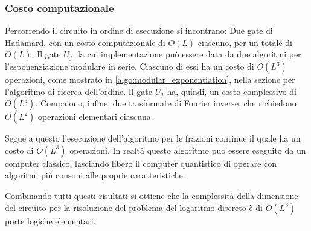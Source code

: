 \subsubsection{Costo computazionale}
Percorrendo il circuito in ordine di esecuzione si incontrano:
Due gate di Hadamard, con un costo computazionale di $O(L)$ ciascuno, per un totale di $O(L)$.
Il gate $U_f$, la cui implementazione può essere data da due algoritmi per l'esponenziazione modulare in serie.
Ciascuno di essi ha un costo di $O(L^3)$ operazioni, come mostrato in \ref{algo:modular_exponentiation}, nella sezione per l'algoritmo di ricerca dell'ordine.
Il gate $U_f$ ha, quindi, un costo complessivo di $O(L^3)$.
Compaiono, infine, due trasformate di Fourier inverse, che richiedono $O(L^2)$ operazioni elementari ciascuna.

Segue a questo l'esecuzione dell'algoritmo per le frazioni continue il quale ha un costo di $O(L^3)$ operazioni.
In realtà questo algoritmo può essere eseguito da un computer classico, lasciando libero il computer quantistico di operare con algoritmi più consoni alle proprie caratteristiche.

Combinando tutti questi risultati si ottiene che la complessità della dimensione del circuito  per la risoluzione del problema del logaritmo discreto è di $O(L^3)$ porte logiche elementari.

